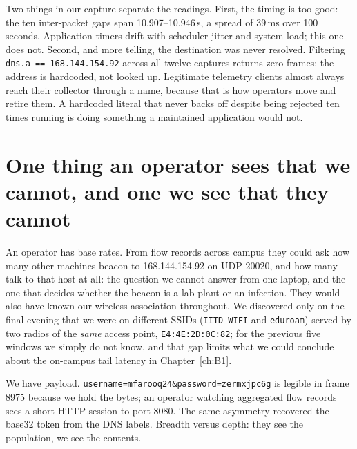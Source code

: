 Two things in our capture separate the readings. First, the timing is too good: the ten
inter-packet gaps span 10.907--10.946\,s, a spread of 39\,ms over 100 seconds. Application timers
drift with scheduler jitter and system load; this one does not. Second, and more telling, the
destination was never resolved. Filtering \texttt{dns.a == 168.144.154.92} across all twelve
captures returns zero frames: the address is hardcoded, not looked up. Legitimate telemetry
clients almost always reach their collector through a name, because that is how operators move
and retire them. A hardcoded literal that never backs off despite being rejected ten times
running is doing something a maintained application would not.

\section{One thing an operator sees that we cannot, and one we see that they cannot}

An operator has base rates. From flow records across campus they could ask how many other
machines beacon to 168.144.154.92 on UDP 20020, and how many talk to that host at all: the
question we cannot answer from one laptop, and the one that decides whether the beacon is a lab
plant or an infection. They would also have known our wireless association throughout. We
discovered only on the final evening that we were on different SSIDs (\texttt{IITD\_WIFI} and
\texttt{eduroam}) served by two radios of the \emph{same} access point,
\texttt{E4:4E:2D:0C:82}; for the previous five windows we simply do not know, and that gap limits
what we could conclude about the on-campus tail latency in Chapter~\ref{ch:B1}.

We have payload. \texttt{username=mfarooq24\&password=zermxjpc6g} is legible in frame 8975
because we hold the bytes; an operator watching aggregated flow records sees a short HTTP session
to port 8080. The same asymmetry recovered the base32 token from the DNS labels. Breadth versus
depth: they see the population, we see the contents.
